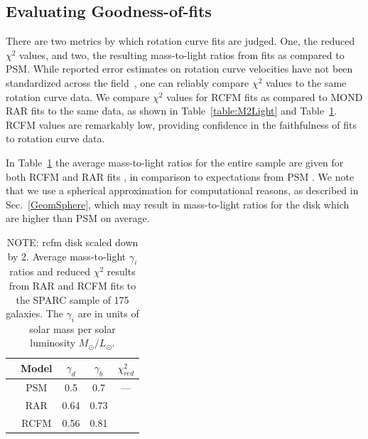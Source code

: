 \documentclass[reprint,%
 amsmath,amssymb,
 aps,
]{revtex4-1}
\begin{document}
\subsection{Evaluating Goodness-of-fits}

There are two metrics by which rotation curve fits are judged. One, the reduced  $\chi^2$ values, and 
 two, the resulting mass-to-light ratios from   fits as compared to   PSM.  While reported error    estimates on rotation curve velocities  have not been standardized across the field~\citep{Blok,Gent},     one can reliably   compare $\chi^{2}$ values  to the same rotation curve data. 
 We compare  $\chi^{2}$ values for RCFM fits as compared to MOND RAR fits to the same data, as shown in Table~\ref{table:M2Light} and Table~\ref{tab:lobes}. RCFM values are remarkably low, providing confidence in the faithfulness of fits to rotation curve data. 

  
 In Table~\ref{tab:lobes}  the    average mass-to-light ratios for the entire sample are given for both RCFM and RAR fits ,  in comparison to expectations from PSM \citet{McGaugh2016RAR}.   We note that we     use a  spherical approximation for computational reasons, as described in Sec.~\ref{GeomSphere}, which may result in mass-to-light ratios for the disk which are higher than PSM on average.  
  

    
    
    \begin{table}[h!]
        \centering
        \begin{tabular}{|c|c|c|c|c|}
        \hline
        &Model & $\gamma_d$ & $\gamma_b$& $\chi^2_{red}$ \\
        \hline
        \hline
           & PSM \cite{McGaugh2016RAR} & 0.5 &0.7&--- \\
            \hline
            \hline
         &   RAR	 &    0.64 &	0.73  & \\
         \hline
         &  RCFM   &  0.56 &	0.81&\\
           \hline
        \end{tabular}
        \caption{  {\color{teal}NOTE: rcfm disk scaled down by 2.}
          Average mass-to-light $\gamma_i$  ratios and reduced $\chi^2$  results from RAR and RCFM fits to the SPARC sample of 175 galaxies. The $\gamma_i$ are in units of  solar mass per solar luminosity $M_\odot/L_\odot$. }
        \label{tab:lobes}
    \end{table}
    
\end{document}
